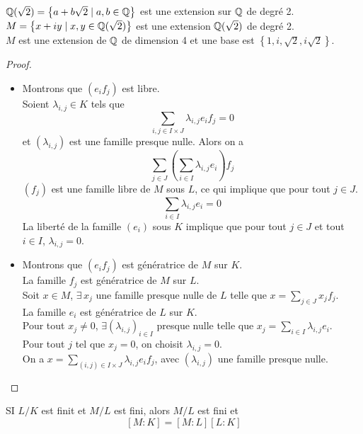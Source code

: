 \begin{example}
	$\mathbb{Q}(\sqrt{2}) = \left\{ a + b\sqrt{2} \mid a,b \in \mathbb{Q} \right\}$ est une extension sur $\mathbb{Q}$ de degré 2.\\
	$M = \left\{ x + iy \mid x,y \in \mathbb{Q}(\sqrt{2}) \right\}$ est une extension $\mathbb{Q}(\sqrt{2})$ de degré 2.\\
	$M$ est une extension de $\mathbb{Q}$ de dimension 4 et une base est $\left\{ 1, i , \sqrt{2}, i\sqrt{2}\right\}$.
\end{example}


\begin{proof}
	\begin{itemize}
		\item Montrons que $(e_if_j)$ est libre. \\
		      Soient $\lambda_{i,j} \in K$ tels que
		      $$ \sum\limits_{i,j \in I \times J} \lambda_{i,j} e_i f_j = 0$$
		      et $(\lambda_{i,j})$ est une famille presque nulle. Alors  on a
		      $$ \sum\limits_{j \in J} \left( \sum\limits_{i \in I} \lambda_{i,j} e_i \right) f_j $$
		      $(f_j)$ est une famille libre de $M$ sous $L$, ce qui implique que pour tout $j \in J$.
		      $$ \sum\limits_{i\in I } \lambda_{i,j} e_i = 0$$
		      La liberté de la famille $(e_i)$ sous $K$ implique que pour tout $j \in J$ et tout $i \in I$, $\lambda_{i,j} = 0$.
		\item Montrons que $(e_if_j)$  est génératrice de $M$ sur $K$.\\
		      La famille $f_j$ est génératrice de $M$ sur $L$.\\
		      Soit $x \in M$, $\exists \, x_j$ une famille presque nulle de $L$ telle que $x = \sum\limits_{j\in J} x_j f_j$.\\
		      La famille $e_i$ est génératrice de $L$ sur $K$.\\
		      Pour tout $x_j \neq 0 $, $\exists (\lambda_{i,j})_{i \in I}$ presque nulle telle que $x_j = \sum\limits_{i \in I} \lambda_{i,j}e_i$.\\
		      Pour tout $j$ tel que $x_j = 0$, on choisit $\lambda_{i,j} = 0$. \\
		      On a $x = \sum\limits_{(i,j)\in I\times J} \lambda_{i,j} e_i f_j$, avec $(\lambda_{i,j})$ une famille presque nulle.
	\end{itemize}
\end{proof}


\begin{coro}[important]
	SI $L / K$ est finit et $M/L$ est fini, alors $M/L$ est fini et
	$$ [M:K] = [M:L] [L:K] $$
\end{coro}


